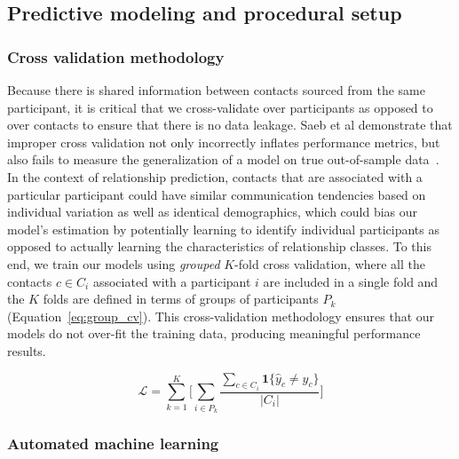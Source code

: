 \documentclass[acmlarge]{acmart}
\begin{document}
\subsection{Predictive modeling and procedural setup}


\subsubsection*{Cross validation methodology}

Because there is shared information between contacts sourced from the same participant, it is critical that we cross-validate over participants as opposed to over contacts to ensure that there is no data leakage. Saeb et al demonstrate that improper cross validation not only incorrectly inflates performance metrics, but also fails to measure the generalization of a model on true out-of-sample data~\cite{saeb2016voodoo}. In the context of relationship prediction, contacts that are associated with a particular participant could have similar communication tendencies based on individual variation as well as identical demographics, which could bias our model's estimation by potentially learning to identify individual participants as opposed to actually learning the characteristics of relationship classes. To this end, we train our models using \textit{grouped} $K$-fold cross validation, where all the contacts $c \in C_i$ associated with a participant $i$ are included in a single fold and the $K$ folds are defined in terms of groups of participants $P_k$ (Equation~\ref{eq:group_cv}). This cross-validation methodology ensures that our models do not over-fit the training data, producing meaningful performance results.

\begin{equation}
    \label{eq:group_cv}
    \mathcal{L} = \sum^K_{k=1} \Big [ \sum_{i \in P_k} \frac{\sum_{c \in C_i} \mathbf{1}\{\hat{y}_c \ne y_c\}}{|C_i|} \Big ]
\end{equation}

\subsubsection*{Automated machine learning}
\end{document}
